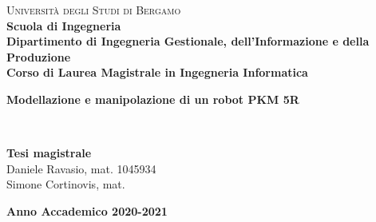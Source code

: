 \begin{titlepage}

\noindent
\begin{minipage}[t]{0.19\textwidth}

\end{minipage}
\begin{minipage}[t]{0.81\textwidth}
{
	{\textsc{Università degli Studi di Bergamo}} \\
	\textbf{Scuola di Ingegneria} \\
	\textbf{Dipartimento di Ingegneria Gestionale, dell'Informazione e della Produzione} \\
	\textbf{Corso di Laurea Magistrale in Ingegneria Informatica} \\
	\par
}
\end{minipage}

\vspace{35mm}

\begin{center}
	{\LARGE{
			\textbf{Modellazione e manipolazione di un robot PKM 5R} \\
			\textbf{}
			\par
	}}
\end{center}

\vspace{40mm}

\noindent
{\large} \\

\vspace{20mm}

\begin{flushright}
	{\large \textbf{Tesi magistrale}} \\
	\large{Daniele Ravasio, mat. 1045934} \\
	\large{Simone Cortinovis, mat. } \\
\end{flushright}

\vspace{10mm}

\begin{center}
    {\large{\bf Anno Accademico 2020-2021}}
\end{center}

\restoregeometry

\end{titlepage}